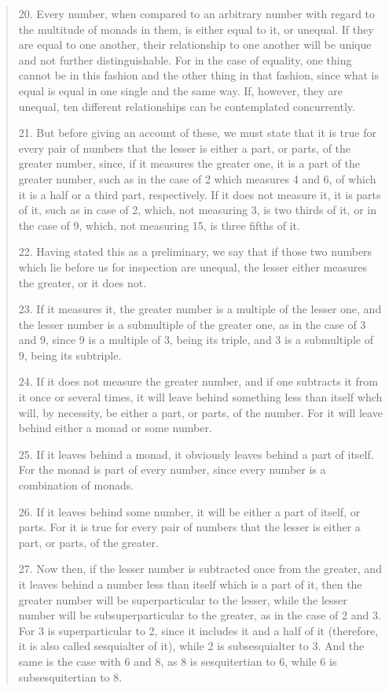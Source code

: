 \documentclass{article}
\begin{document}
\begin{quote}
20. Every number, when compared to an arbitrary number with regard to the multitude
of monads in them, is either equal to it, or unequal. If they are equal to one another,
their relationship to one another will be unique and not further distinguishable.
For in the case of equality, one thing cannot be in this fashion and the other thing in
that fashion, since what is equal is equal in one single and the same way. If, however,
they are unequal, ten different relationships can be contemplated concurrently. 

21. But before giving an account of these, we must state that it is true for every pair
of numbers that the lesser is either a part, or parts, of the greater number, since, if it
measures the greater one, it is a part of the greater number, such as in the case of 2
which measures 4 and 6, of which it is a half or a third part, respectively. If it does not
measure it, it is parts of it, such as in case of 2, which, not measuring 3, is two thirds of
it, or in the case of 9, which, not measuring 15, is three fifths of it.

22. Having stated this as a preliminary, we say that if those two numbers which lie
before us for inspection are unequal, the lesser either measures the greater, or it does
not.

23. If it measures it, the greater number is a multiple of the lesser one, and the lesser
number is a submultiple of the greater one, as in the case of 3 and 9, since 9 is a multiple 
of 3, being its triple, and 3 is a submultiple of 9, being its subtriple.

24. If it does not measure the greater number, and if one subtracts it from it once or
several times, it will leave behind something less than itself whch will, by necessity, be
either a part, or parts, of the number. For it will leave behind either a monad or some
number.

25. If it leaves behind a monad, it obviously leaves behind a part of itself. For the
monad is part of every number, since every number is a combination of monads.

26. If it leaves behind some number, it will be either a part of itself, or parts. For it is
true for every pair of numbers that the lesser is either a part, or parts, of the greater.

27. Now then, if the lesser number is subtracted once from the greater, and it leaves
behind a number less than itself which is a part of it, then the greater number will be
superparticular to the lesser, while the lesser number will be subsuperparticular to the
greater, as in the case of 2 and 3. For 3 is superparticular to 2, since it includes it and a
half of it (therefore, it is also called sesquialter of it), while 2 is subsesquialter to 3. And
the same is the case with 6 and 8, as 8 is sesquitertian to 6, while 6 is subsesquitertian
to 8.


\end{quote}
\end{document}

